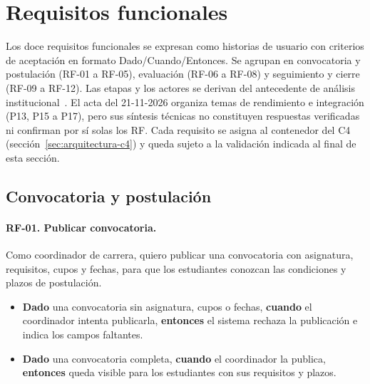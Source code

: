 \section{Requisitos funcionales}
\label{sec:requisitos-funcionales}

Los doce requisitos funcionales se expresan como historias de usuario con criterios de aceptación en formato Dado/Cuando/Entonces. Se agrupan en convocatoria y postulación (RF-01 a RF-05), evaluación (RF-06 a RF-08) y seguimiento y cierre (RF-09 a RF-12). Las etapas y los actores se derivan del antecedente de análisis institucional~\cite{sgacAntecedente}. El acta del 21-11-2026 organiza temas de rendimiento e integración (P13, P15 a P17), pero sus síntesis técnicas no constituyen respuestas verificadas ni confirman por sí solas los RF. Cada requisito se asigna al contenedor del C4 (sección~\ref{sec:arquitectura-c4}) y queda sujeto a la validación indicada al final de esta sección.

\newcommand{\rfcriterio}[3]{\item \textbf{Dado} #1, \textbf{cuando} #2, \textbf{entonces} #3.}

\subsection{Convocatoria y postulación}

\paragraph{RF-01. Publicar convocatoria.} Como coordinador de carrera, quiero publicar una convocatoria con asignatura, requisitos, cupos y fechas, para que los estudiantes conozcan las condiciones y plazos de postulación.
\begin{itemize}
  \rfcriterio{una convocatoria sin asignatura, cupos o fechas}{el coordinador intenta publicarla}{el sistema rechaza la publicación e indica los campos faltantes}
  \rfcriterio{una convocatoria completa}{el coordinador la publica}{queda visible para los estudiantes con sus requisitos y plazos}
\end{itemize}

